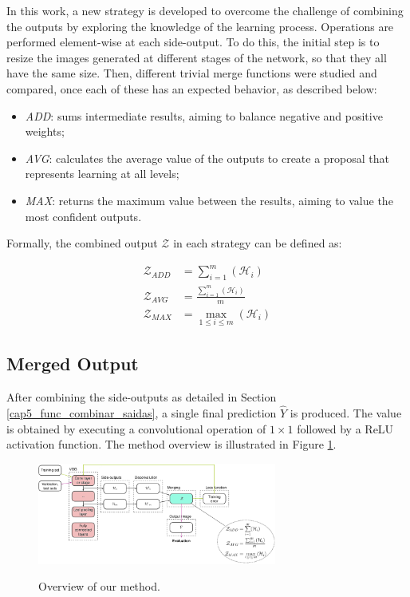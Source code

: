 In this work, a new strategy is developed to overcome the challenge of combining the outputs by exploring the knowledge of the learning process.
Operations are performed element-wise at each side-output.
To do this, the initial step is to resize the images generated at different stages of the network, so that they all have the same size.
Then, different trivial merge functions were studied and compared, once each of these has an expected behavior, as described below:

\begin{itemize}
  \item \textit{ADD}: sums intermediate results, aiming to balance negative and positive weights;
  \item \textit{AVG}: calculates the average value of the outputs to create a proposal that represents learning at all levels;
  \item \textit{MAX}: returns the maximum value between the results, aiming to value the most confident outputs.
\end{itemize}

Formally, the combined output $\mathcal{Z}$ in each strategy can be defined as:

\begin{align}
  \mathcal{Z}_{ADD} &= \sum_{i=1}^{m}(\mathcal{H}_i)\\
  \mathcal{Z}_{AVG} &= \frac{\sum_{i=1}^{m}(\mathcal{H}_i)}{m}\\
  \mathcal{Z}_{MAX} &= \max_{1 \leq i \leq m} (\mathcal{H}_i)
\end{align} 

\subsection{Merged Output}
\label{cap5_saida_final_rede}

After combining the side-outputs as detailed in Section \ref{cap5_func_combinar_saidas}, a single final prediction $\hat{Y}$ is produced.
The value is obtained by executing a convolutional operation of $1 \times 1$ followed by a ReLU activation function.
The method overview is illustrated in Figure \ref{fig:method}.

\begin{figure}
  \centering
  \caption{Overview of our method.}
  \includegraphics[width=0.7\textwidth]{../imagens/ilustracoes/cap5_metodo.png}
  \sourceOwn
  \label{fig:method}
\end{figure}


